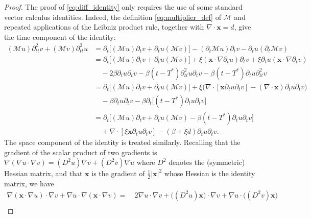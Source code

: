 \documentclass[a4paper]{article}
\theoremstyle{plain}
\theoremstyle{definition}
\newcommand{\operator}[1]{\mathcal{#1}}
\newcommand{\Div}[1]{\nabla \cdot #1}
\newcommand{\Grad}[1]{\nabla #1}
\newcommand{\TimeDer}{{\partial^{}_t}}
\newcommand{\SecondTimeDer}{{\partial^2_{tt}}}
\newcommand{\vect}[1]{\bm{#1}}
\newcommand{\oM}{{\operator{M}}}
\newcommand{\vx}{{\vect x}}
\begin{document}
\begin{proof}

The proof of \eqref{eq:diff_identity} only requires the use of some standard vector calculus identities.
Indeed, the definition \eqref{eq:multiplier_def} of $\oM$ and repeated applications of the Leibniz product rule, together with $\Div\vx=d$, give the time component of the identity:
\begin{equation}
		\label{eq:time_component}\begin{split}
			(\operator{M}u) \SecondTimeDer{v}
			+ (\operator{M}v) \SecondTimeDer{u}
			&=
			\TimeDer{} \big[
				(\operator{M} u)\TimeDer{v} +
				\TimeDer{u}(\operator{M} v)
				\big]
			- (\TimeDer\oM u) \TimeDer v
			- \TimeDer u (\TimeDer \oM v) \\ & =
			\TimeDer{} \big[
				(\operator{M} u)\TimeDer{v} + \TimeDer{u}(\operator{M} v)
				\big]
			+ \xi (\vect{x} \cdot \Grad \TimeDer{u})  \TimeDer{v}
			+ \xi \TimeDer{u} (\vect{x} \cdot \Grad \TimeDer{v}) \\ &
			\quad  - 2 \beta \TimeDer{u} \TimeDer{v}
			- \beta (t-T^*)\SecondTimeDer{u} \TimeDer{v}
			- \beta (t-T^*)\TimeDer{u} \SecondTimeDer{v}
			\\ & =
			\TimeDer{} \big[
				(\operator{M} u)\TimeDer{v} + \TimeDer{u}(\operator{M} v)
				\big]
			+ \xi \big(
			\Div [\vx  \TimeDer u \TimeDer v]
			- (\Div \vx)\TimeDer u \TimeDer v
			\big) \\ & \quad
			-\beta\TimeDer{u} \TimeDer{v}
			-\beta \TimeDer \big[
				(t-T^*) \TimeDer u \TimeDer v
				\big]
			\\ & =
			\TimeDer{} \big[
				(\operator{M} u)\TimeDer{v} + \TimeDer{u}(\operator{M} v) - \beta (t-T^*) \TimeDer u \TimeDer v
				\big] \\ & \quad
			+ \Div [\xi \vx  \TimeDer u \TimeDer v]
			- (\beta+\xi d)\TimeDer u \TimeDer v.
		\end{split}
	\end{equation}
The space component of the identity is treated similarly.
	Recalling that the gradient of the scalar product of two gradients is
	$\Grad(\Grad u\cdot\Grad v)=(D^2u)\Grad v+(D^2v) \Grad u$ where $D^2$ denotes the (symmetric) Hessian matrix,
	and that $\vx$ is the gradient of $\frac12|\vx|^2$ whose Hessian is the identity matrix, we have
	\begin{align*}
		\Grad(\vx\cdot\Grad u)\cdot\Grad v+\Grad u\cdot\Grad(\vx\cdot\Grad v)
		= & \ 2\Grad u\cdot\Grad v + \big((D^2u) \vx\big)\cdot\Grad v+\Grad u\cdot\big((D^2 v) \vx\big) \\

\end{align*}
\end{proof}
\end{document}
